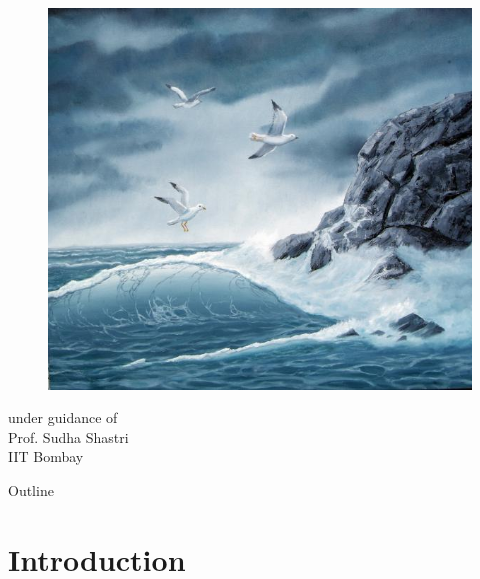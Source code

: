 \documentclass{beamer}
\begin{document}
\begin{frame}[plain]
\titlepage
\begin{center}
\begin{figure}[htp]
  \begin{center}
    \centering
    \includegraphics[scale=0.17]{../Presentation/title.jpg}
  \end{center}
\end{figure}
under guidance of\\
Prof. Sudha Shastri\\
IIT Bombay
\end{center}
\end{frame}
\begin{frame}{Outline}
  \begin{multicols}{2}
  \tableofcontents  
  \end{multicols}
\end{frame}
\section{Introduction}
\end{document}
